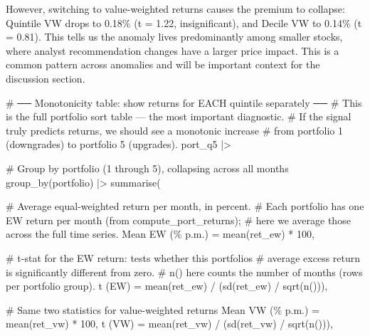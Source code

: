 \documentclass[
  letterpaper,
  DIV=11,
  numbers=noendperiod]{scrartcl}
\newenvironment{Shaded}{\begin{snugshade}}{\end{snugshade}}
\newcommand{\AttributeTok}[1]{\textcolor[rgb]{0.40,0.45,0.13}{#1}}
\newcommand{\CommentTok}[1]{\textcolor[rgb]{0.37,0.37,0.37}{#1}}
\newcommand{\DecValTok}[1]{\textcolor[rgb]{0.68,0.00,0.00}{#1}}
\newcommand{\FunctionTok}[1]{\textcolor[rgb]{0.28,0.35,0.67}{#1}}
\newcommand{\NormalTok}[1]{\textcolor[rgb]{0.00,0.23,0.31}{#1}}
\newcommand{\OtherTok}[1]{\textcolor[rgb]{0.00,0.23,0.31}{#1}}
\newcommand{\SpecialCharTok}[1]{\textcolor[rgb]{0.37,0.37,0.37}{#1}}
\newcommand{\StringTok}[1]{\textcolor[rgb]{0.13,0.47,0.30}{#1}}
\begin{document}
However, switching to value-weighted returns causes the premium to
collapse: Quintile VW drops to 0.18\% (t = 1.22, insignificant), and
Decile VW to 0.14\% (t = 0.81). This tells us the anomaly lives
predominantly among smaller stocks, where analyst recommendation changes
have a larger price impact. This is a common pattern across anomalies
and will be important context for the discussion section.

\begin{Shaded}
\begin{Highlighting}[]
\CommentTok{\# ── Monotonicity table: show returns for EACH quintile separately ──}
\CommentTok{\# This is the full portfolio sort table — the most important diagnostic.}
\CommentTok{\# If the signal truly predicts returns, we should see a monotonic increase}
\CommentTok{\# from portfolio 1 (downgrades) to portfolio 5 (upgrades).}
\NormalTok{port\_q5 }\SpecialCharTok{|\textgreater{}}
  
  \CommentTok{\# Group by portfolio (1 through 5), collapsing across all months}
  \FunctionTok{group\_by}\NormalTok{(portfolio) }\SpecialCharTok{|\textgreater{}}
  \FunctionTok{summarise}\NormalTok{(}
    
    \CommentTok{\# Average equal{-}weighted return per month, in percent.}
    \CommentTok{\# Each portfolio has one EW return per month (from compute\_port\_returns);}
    \CommentTok{\# here we average those across the full time series.}
    \StringTok{\textasciigrave{}}\AttributeTok{Mean EW (\% p.m.)}\StringTok{\textasciigrave{}} \OtherTok{=} \FunctionTok{mean}\NormalTok{(ret\_ew) }\SpecialCharTok{*} \DecValTok{100}\NormalTok{,}
    
    \CommentTok{\# t{-}stat for the EW return: tests whether this portfolio\textquotesingle{}s}
    \CommentTok{\# average excess return is significantly different from zero.}
    \CommentTok{\# n() here counts the number of months (rows per portfolio group).}
    \StringTok{\textasciigrave{}}\AttributeTok{t (EW)}\StringTok{\textasciigrave{}} \OtherTok{=} \FunctionTok{mean}\NormalTok{(ret\_ew) }\SpecialCharTok{/}\NormalTok{ (}\FunctionTok{sd}\NormalTok{(ret\_ew) }\SpecialCharTok{/} \FunctionTok{sqrt}\NormalTok{(}\FunctionTok{n}\NormalTok{())),}
    
    \CommentTok{\# Same two statistics for value{-}weighted returns}
    \StringTok{\textasciigrave{}}\AttributeTok{Mean VW (\% p.m.)}\StringTok{\textasciigrave{}} \OtherTok{=} \FunctionTok{mean}\NormalTok{(ret\_vw) }\SpecialCharTok{*} \DecValTok{100}\NormalTok{,}
    \StringTok{\textasciigrave{}}\AttributeTok{t (VW)}\StringTok{\textasciigrave{}} \OtherTok{=} \FunctionTok{mean}\NormalTok{(ret\_vw) }\SpecialCharTok{/}\NormalTok{ (}\FunctionTok{sd}\NormalTok{(ret\_vw) }\SpecialCharTok{/} \FunctionTok{sqrt}\NormalTok{(}\FunctionTok{n}\NormalTok{())),}
    

\end{Highlighting}
\end{Shaded}
\end{document}
